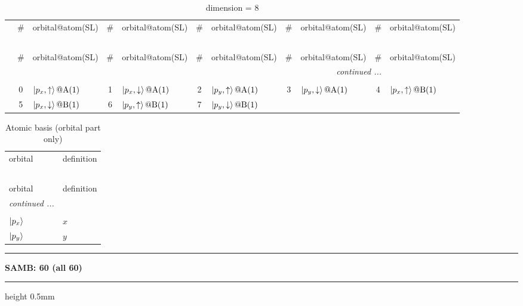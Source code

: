 \documentclass[fleqn,10pt,landscape]{jsarticle}
\begin{document}
\renewcommand{\arraystretch}{1.6}
\begin{longtable}[l]{c|cl|cl|cl|cl|cl}
\captionsetup{justification=raggedright, singlelinecheck=off}
\caption{dimension = 8}
 \\
 \hline \hline
 & \# & orbital@atom(SL) & \# & orbital@atom(SL) & \# & orbital@atom(SL) & \# & orbital@atom(SL) & \# & orbital@atom(SL) \\ \hline \endfirsthead

\multicolumn{10}{l}{\tablename\ \thetable{}} \\
 \hline \hline
 & \# & orbital@atom(SL) & \# & orbital@atom(SL) & \# & orbital@atom(SL) & \# & orbital@atom(SL) & \# & orbital@atom(SL) \\ \hline \endhead

 \hline \hline
\multicolumn{10}{r}{\footnotesize\it continued ...} \\ \endfoot

 \hline \hline
\multicolumn{10}{r}{} \\ \endlastfoot

 & 0 & $\ket{p_{x},\uparrow}@{\rm A}(1)$ & 1 & $\ket{p_{x},\downarrow}@{\rm A}(1)$ & 2 & $\ket{p_{y},\uparrow}@{\rm A}(1)$ & 3 & $\ket{p_{y},\downarrow}@{\rm A}(1)$ & 4 & $\ket{p_{x},\uparrow}@{\rm B}(1)$ \\
& 5 & $\ket{p_{x},\downarrow}@{\rm B}(1)$ & 6 & $\ket{p_{y},\uparrow}@{\rm B}(1)$ & 7 & $\ket{p_{y},\downarrow}@{\rm B}(1)$ &  &  &  &  \\
\end{longtable}
\renewcommand{\arraystretch}{1.6}
\begin{longtable}[l]{ll}
\captionsetup{justification=raggedright, singlelinecheck=off}
\caption{Atomic basis (orbital part only)}
 \\
 \hline \hline
orbital & definition \\ \hline \endfirsthead

\multicolumn{1}{l}{\tablename\ \thetable{}} \\
 \hline \hline
orbital & definition \\ \hline \endhead

 \hline \hline
\multicolumn{1}{r}{\footnotesize\it continued ...} \\ \endfoot

 \hline \hline
\multicolumn{1}{r}{} \\ \endlastfoot

$ \ket{p_{x}} $ & $ x $ \\
$ \ket{p_{y}} $ & $ y $ \\
\end{longtable}
\vspace{5mm}
\noindent \rule[0.5mm]{5mm}{0.5mm}\hspace{3mm}\textbf{SAMB: 60 (all 60)}\hspace{3mm}\leaders\hrule height 0.5mm\hfill\kern0pt
\vspace{3mm}
\end{document}
